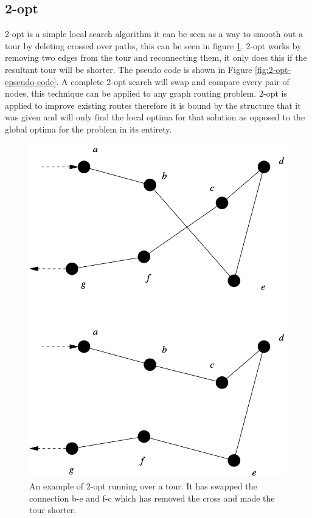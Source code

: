 \subsection{2-opt}

2-opt is a simple local search algorithm it can be seen as a way to smooth out a tour by deleting crossed over paths, this can be seen in figure \ref{fig:2-opt-example}. 2-opt works by removing two edges from the tour and reconnecting them, it only does this if the resultant tour will be shorter. The pseudo code is shown in Figure \ref{fig:2-opt-epseudo-code}. A complete 2-opt search will swap and compare every pair of nodes, this technique can be applied to any graph routing problem. 2-opt is applied to improve existing routes therefore it is bound by the structure that it was given and will only find the local optima for that solution as opposed to the global optima for the problem in its entirety. 

\begin{figure}
    \centering
    \includegraphics[width=\textwidth]{figures/2-opt-example.png}
    \caption{An example of 2-opt running over a tour. It has swapped the connection b-e and f-c which has removed the cross and made the tour shorter.\cite{2_opt_example_picture}}
    \label{fig:2-opt-example}
\end{figure}

